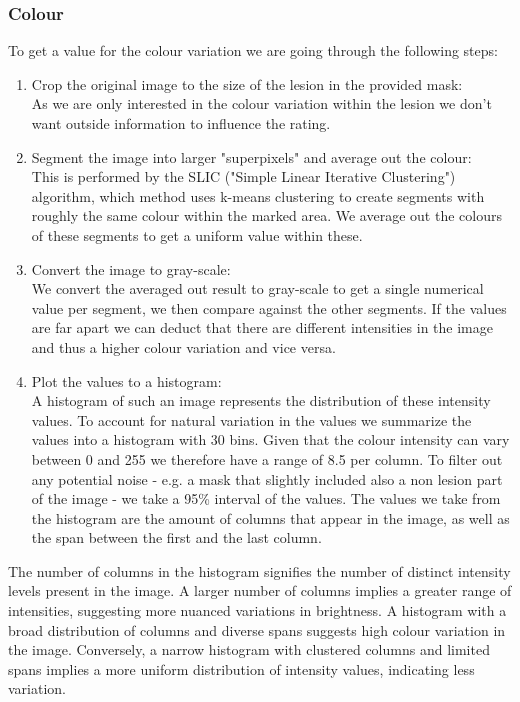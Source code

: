 \subsubsection{Colour}
To get a value for the colour variation we are going through the following steps:
\begin{enumerate}
    \item Crop the original image to the size of the lesion in the provided mask:\\
    As we are only interested in the colour variation within the lesion we don't want outside information to influence the rating.
    \item Segment the image into larger "superpixels" and average out the colour:\\
    This is performed by the SLIC ("Simple Linear Iterative Clustering") algorithm, which method uses k-means clustering to create segments with roughly the same colour within the marked area. We average out the colours of these segments to get a uniform value within these.
    \item Convert the image to gray-scale:\\
    We convert the averaged out result to gray-scale to get a single numerical value per segment, we then compare against the other segments. If the values are far apart we can deduct that there are different intensities in the image and thus a higher colour variation and vice versa.
    \item Plot the values to a histogram:\\
    A histogram of such an image represents the distribution of these intensity values. To account for natural variation in the values we summarize the values into a histogram with 30 bins. Given that the colour intensity can vary between 0 and 255 we therefore have a range of 8.5 per column. To filter out any potential noise - e.g. a mask that slightly included also a non lesion part of the image - we take a 95\% interval of the values.
    The values we take from the histogram are the amount of columns that appear in the image, as well as the span between the first and the last column.
\end{enumerate}
The number of columns in the histogram signifies the number of distinct intensity levels present in the image. A larger number of columns implies a greater range of intensities, suggesting more nuanced variations in brightness. A histogram with a broad distribution of columns and diverse spans suggests high colour variation in the image. Conversely, a narrow histogram with clustered columns and limited spans implies a more uniform distribution of intensity values, indicating less variation. 

